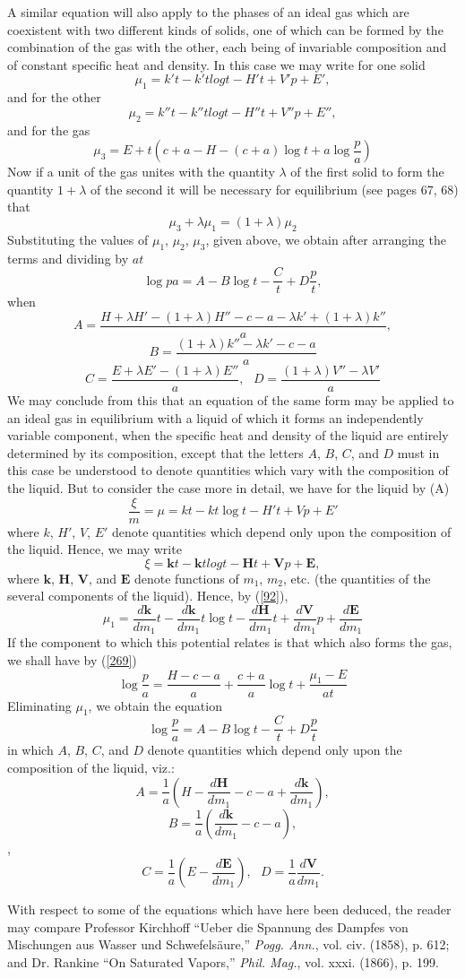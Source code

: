\documentclass[12pt]{article}
\begin{document}
{\par A similar equation will also apply to the phases of an ideal gas which are coexistent with two different kinds of solids, one of which can be formed by the combination of the gas with the other, each being of invariable composition and of constant specific heat and density. In this case we may write for one solid
$$\mu_1=  k't - k't log t - H't + V'p + E',$$
and for the other    
$$\mu_2= k''t - k''t log t - H''t + V''p + E'',$$
and for the gas      
$$\mu_3= E+t\left(c+a-H-(c+a) \log t+ a \log \frac{p}{a}\right)$$
Now if a unit of the gas unites with the quantity $\lambda$ of the first solid to form the quantity $1 +\lambda $ of the second it will be necessary for equilibrium (see pages 67, 68) that
$$ \mu_3 + \lambda \mu_1=(1 +\lambda) \mu_2$$
Substituting the values of $\mu_1$, $\mu_2$, $\mu_3$, given above, we obtain after arranging the terms and dividing by $at$
$$\log{p}{a} = A -B \log t -\frac{C}{t} + D \frac{p}{t},  $$
when    
$$ A= \frac{H+\lambda H' -(1 + \lambda)H''-c-a-\lambda k' + (1+\lambda)k''}{a},$$
$$B=\frac{(1+\lambda)k''-\lambda k' -c - a}{a}$$
$$C= \frac{E+\lambda E'- (1+\lambda)E''}{a} , \ \ \     D=\frac{(1 +\lambda) V''- \lambda V'}{a}$$
We may conclude from this that an equation of the same form may be applied to an ideal gas in equilibrium with a liquid of which it forms an independently variable component, when the specific heat and density of the liquid are entirely determined by its composition, except that the letters $A$, $B$, $C$, and $D$ must in this case be understood to denote quantities which vary with the composition of the liquid. But to consider the case more in detail, we have for the liquid by (A)
$$\frac{\xi}{m}= \mu = kt - kt \log t - H't + Vp + E'$$
where $k$, $H'$, $V$, $E'$ denote quantities which depend only upon the composition of the liquid. Hence, we may write
$$\xi=\mathbf{k}t - \mathbf{k}t log t - \mathbf{H}t + \mathbf{V}p + \mathbf{E},$$
where $\mathbf{k}$, $\mathbf{H}$, $\mathbf{V}$, and $\mathbf{E}$ denote functions of $m_1$, $m_2$, etc. (the quantities of the several components of the liquid). Hence, by (\ref{92}),
$$\mu_1 = \frac{d\mathbf{k}}{dm_1 } t- \frac{d\mathbf{k}}{dm_1} t\log t - 
\frac{d\mathbf{H}}{dm_1 } t + \frac{d\mathbf{V}}{dm_1 }p+\frac{d\mathbf{E}}{dm_1 } $$
If the component to which this potential relates is that which also forms the gas, we shall have by (\ref{269})
$$\log \frac{p}{a}=\frac{H-c-a}{a} + \frac{c+a}{a} \log t + \frac{\mu_1-E}{at} $$
Eliminating $\mu_1$, we obtain the equation
$$\log\frac{p}{a}=A - B \log t - \frac{C}{t} + D \frac{p}{t}$$
in which $A$, $B$, $C$, and $D$ denote quantities which depend only upon the composition of the liquid, viz.:
$$A =  \frac{1}{a} \left(H- \frac{d\mathbf{H}}{dm_1}-c-a +\frac{d\mathbf{k}}{dm_1}\right),$$
$$B=  \frac{1}{a} \left( \frac{d\mathbf{k}}{dm_1}-c-a\right),$$,
$$C=\frac{1}{a} \left(E - \frac{d\mathbf{E}}{dm_1}\right), \ \ \  D=\frac{1}{a} \frac{d\mathbf{V}}{dm_1}.$$
\par With respect to some of the equations which have here been deduced, the reader may compare Professor Kirchhoff ``Ueber die Spannung des Dampfes von Mischungen aus Wasser und Schwefelsäure,'' \textit{Pogg. Ann.}, vol. civ. (1858), p. 612; and Dr. Rankine ``On Saturated Vapors,'' \textit{Phil. Mag.}, vol. xxxi. (1866), p. 199.}
\end{document}
